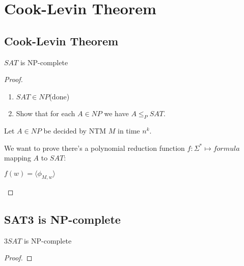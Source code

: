 \chapter{Cook-Levin Theorem}

\section{Cook-Levin Theorem}

\begin{theorem}
    \(SAT\) is NP-complete 
\end{theorem}
\begin{proof}
    \begin{enumerate}
        \item \(SAT \in NP\)(done)
        \item Show that for each \(A \in NP\) we have \(A \leq_P SAT\).   
    \end{enumerate}

    Let \(A \in NP\) be decided by NTM \(M\) in time \(n^k\).   

    We want to prove there's a polynomial reduction function \(f: \Sigma^* \mapsto formula\) mapping \(A\) to \(SAT\):

    \(f(w) = \langle \phi_{M, w} \rangle\)  


    \begin{definition}[tableau]
        
    \end{definition}



\end{proof}

\section{SAT3 is NP-complete}
\begin{theorem}
    \(3SAT\) is NP-complete 
\end{theorem}
\begin{proof}
    
\end{proof}